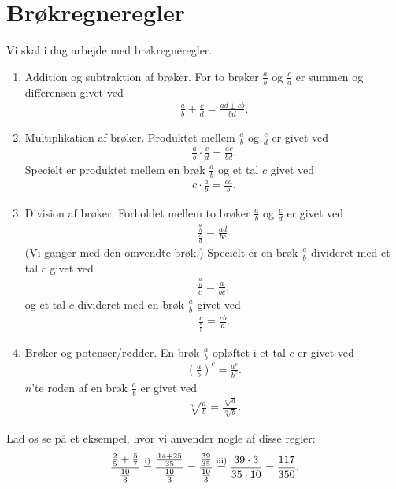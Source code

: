 \section*{Brøkregneregler}

Vi skal i dag arbejde med brøkregneregler.
\begin{enumerate}[label=\roman*)]
\item Addition og subtraktion af brøker. For to brøker $\frac{a}{b}$ og $\frac{c}{d}$ er summen og differensen givet ved
\begin{align*}
\frac{a}{b} \pm \frac{c}{d} = \frac{ad\pm cb}{bd}.
\end{align*}
\item Multiplikation af brøker. Produktet mellem $\frac{a}{b}$ og $\frac{c}{d}$ er givet ved
\begin{align*}
\frac{a}{b}\cdot \frac{c}{d} = \frac{ac}{bd}.
\end{align*}
Specielt er produktet mellem en brøk $\frac{a}{b}$ og et tal $c$ givet ved
\begin{align*}
c\cdot \frac{a}{b} = \frac{ca}{b}.
\end{align*}
\item Division af brøker. Forholdet mellem to brøker $\frac{a}{b}$ og $\frac{c}{d}$ er givet ved
\begin{align*}
\frac{\frac{a}{b}}{\frac{c}{d}} = \frac{ad}{bc}.
\end{align*}
(Vi ganger med den omvendte brøk.) Specielt er en brøk $\frac{a}{b}$ divideret med et tal $c$ givet ved
\begin{align*}
\frac{\frac{a}{b}}{c} = \frac{a}{bc},
\end{align*}
og et tal $c$ divideret med en brøk $\frac{a}{b}$ givet ved
\begin{align*}
\frac{c}{\frac{a}{b}} = \frac{cb}{a}.
\end{align*}
\item Brøker og potenser/rødder. En brøk $\frac{a}{b}$ opløftet i et tal $c$ er givet ved 
\begin{align*}
\left(\frac{a}{b}\right)^{c} = \frac{a^c}{b^c}.
\end{align*}
$n$'te roden af en brøk $\frac{a}{b}$ er givet ved 
\begin{align*}
\sqrt[n]{\frac{a}{b}} = \frac{\sqrt[n]{a}}{\sqrt[n]{b}}.
\end{align*}
\end{enumerate}
\begin{exa}
Lad os se på et eksempel, hvor vi anvender nogle af disse regler:
\begin{align*}
\frac{\frac{2}{5}+\frac{5}{7}}{\frac{10}{3}} \overset{\textnormal{i)}}{=} \frac{\frac{14+25}{35}}{\frac{10}{3}} = \frac{\frac{39}{35}}{\frac{10}{3}} \overset{\textnormal{iii)}}{=} \frac{39\cdot 3}{35 \cdot 10} = \frac{117}{350}.
\end{align*}
\end{exa}

